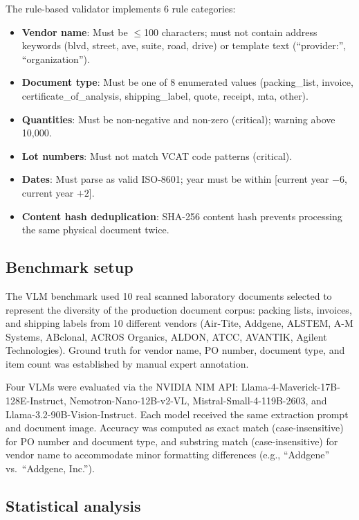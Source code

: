 \documentclass[11pt]{article}
\begin{document}
The rule-based validator implements 6 rule categories:
\begin{itemize}
  \item \textbf{Vendor name}: Must be $\leq$100 characters; must not
    contain address keywords (blvd, street, ave, suite, road, drive) or
    template text (``provider:'', ``organization'').
  \item \textbf{Document type}: Must be one of 8 enumerated values
    (packing\_list, invoice, certificate\_of\_analysis, shipping\_label,
    quote, receipt, mta, other).
  \item \textbf{Quantities}: Must be non-negative and non-zero
    (critical); warning above 10,000.
  \item \textbf{Lot numbers}: Must not match VCAT code patterns
    (critical).
  \item \textbf{Dates}: Must parse as valid ISO-8601; year must be
    within [current year $- 6$, current year $+ 2$].
  \item \textbf{Content hash deduplication}: SHA-256 content hash
    prevents processing the same physical document twice.
\end{itemize}

\subsection{Benchmark setup}

The VLM benchmark used 10 real scanned laboratory documents selected to
represent the diversity of the production document corpus: packing lists,
invoices, and shipping labels from 10 different vendors (Air-Tite, Addgene,
ALSTEM, A-M Systems, ABclonal, ACROS Organics, ALDON, ATCC, AVANTIK,
Agilent Technologies). Ground truth for vendor name, PO number, document
type, and item count was established by manual expert annotation.

Four VLMs were evaluated via the NVIDIA NIM API:
Llama-4-Maverick-17B-128E-Instruct,
Nemotron-Nano-12B-v2-VL,
Mistral-Small-4-119B-2603, and
Llama-3.2-90B-Vision-Instruct.
Each model received the same extraction prompt and document image. Accuracy
was computed as exact match (case-insensitive) for PO number and document
type, and substring match (case-insensitive) for vendor name to accommodate
minor formatting differences (e.g., ``Addgene'' vs.\ ``Addgene, Inc.'').

\subsection{Statistical analysis}
\label{sec:stats}
\end{document}
